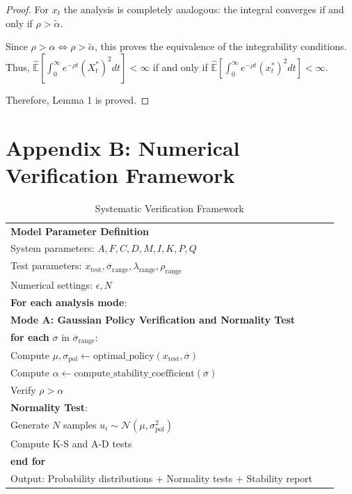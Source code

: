 \documentclass[onecolumn, journal]{IEEEtran} %
\begin{document}
\begin{proof}
		For $x_t$ the analysis is completely analogous: the integral converges if and only if $\rho > \tilde{\alpha}$.
		
		Since $\rho > \alpha \iff \rho > \tilde{\alpha}$, this proves the equivalence of the integrability conditions. Thus, $\hat{\mathbb{E}}\left[\int_0^\infty e^{-\rho t} (X_t^*)^2 dt\right] < \infty$ if and only if $\hat{\mathbb{E}}\left[\int_0^\infty e^{-\rho t} (x_t^*)^2 dt\right] < \infty$. 
		
		Therefore, Lemma 1 is proved.
	\end{proof}
	
	
	\newpage
	\section*{Appendix B: Numerical Verification Framework}
	\begin{table}[h]
		\centering
		\caption{Systematic Verification Framework}
		\label{tab:verification-framework}
		\footnotesize
		\begin{tabular}{@{}p{0.95\linewidth}@{}}
			\toprule
			\textbf{Model Parameter Definition}\\
			System parameters: $A, F, C, D, M, I, K, P, Q$\\
			Test parameters: $x_{\mathrm{test}}, \overline{\sigma}_{\mathrm{range}}, \lambda_{\mathrm{range}}, \rho_{\mathrm{range}}$\\
			Numerical settings: $\epsilon, N$\\
			\midrule
			\textbf{For each analysis mode}:\\
			\quad \textbf{Mode A: Gaussian Policy Verification and Normality Test}\\
			\quad \quad \textbf{for each} $\sigma$ in $\overline{\sigma}_{\mathrm{range}}$:\\
			\quad \quad \quad Compute $\mu, \sigma_{\mathrm{pol}} \leftarrow \mathrm{optimal\_policy}(x_{\mathrm{test}}, \overline{\sigma})$\\
			\quad \quad \quad Compute $\alpha \leftarrow \mathrm{compute\_stability\_coefficient}(\overline{\sigma})$\\
			\quad \quad \quad Verify $\rho > \alpha$\\
			\quad \quad \quad \textbf{Normality Test}:\\
			\quad \quad \quad \quad Generate $N$ samples $u_i \sim \mathcal{N}(\mu, \sigma_{\mathrm{pol}}^2)$\\
			\quad \quad \quad \quad Compute K-S and A-D tests\\
			\quad \quad \textbf{end for}\\
			\quad \quad Output: Probability distributions + Normality tests + Stability report\\[2pt]
			

\end{tabular}
\end{table}
\end{document}
